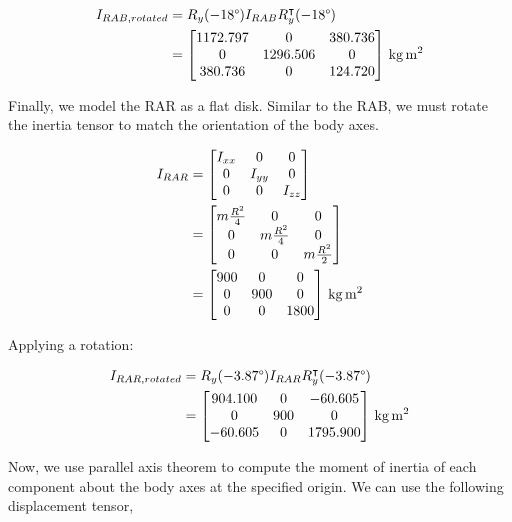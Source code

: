 \begin{align*}
I_{RAB,rotated} &= R_{y}(-18\degree) I_{RAB} R_{y}^{\intercal}(-18\degree) \\
&=
\qty[parse-numbers = false]{
\begin{bmatrix}
1172.797 & 0 & 380.736 \\
0 & 1296.506 & 0 \\
380.736 & 0 & 124.720
\end{bmatrix}
}{\kilogram\metre\squared}
\end{align*}

Finally, we model the RAR as a flat disk. Similar to the RAB, we must rotate the inertia tensor to match the orientation of the body axes.

\begin{align*}
I_{RAR} &=
\begin{bmatrix}
I_{xx} & 0 & 0 \\
0 & I_{yy} & 0 \\
0 & 0 & I_{zz}
\end{bmatrix} \\
&=
\begin{bmatrix}
m \frac{R^{2}}{4} & 0 & 0 \\
0 & m \frac{R^{2}}{4} & 0 \\
0 & 0 & m \frac{R^{2}}{2} 
\end{bmatrix} \\
&=
\qty[parse-numbers = false]{
\begin{bmatrix}
900 & 0 & 0 \\
0 & 900 & 0 \\
0 & 0 & 1800 
\end{bmatrix}
}{\kilogram\metre\squared}
\end{align*}

Applying a rotation:

\begin{align*}
I_{RAR,rotated} &= R_{y}(-3.87\degree) I_{RAR} R_{y}^{\intercal}(-3.87\degree) \\
&=
\qty[parse-numbers = false]{
\begin{bmatrix}
904.100 & 0 & -60.605 \\
0 & 900 & 0 \\
-60.605 & 0 & 1795.900
\end{bmatrix}
}{\kilogram\metre\squared}
\end{align*}

Now, we use parallel axis theorem to compute the moment of inertia of each component about the body axes at the specified origin. We can use the following displacement tensor,

